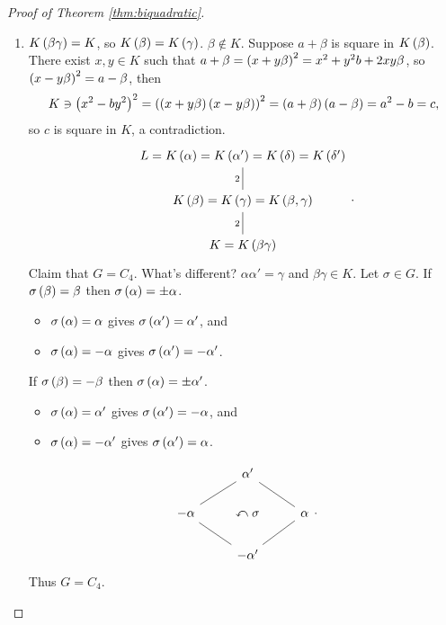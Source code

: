 \begin{proof}[Proof of Theorem \ref{thm:biquadratic}]
\begin{enumerate}
\item $ K\left( \beta\gamma \right) = K $, so $ K\left( \beta \right) = K\left( \gamma \right) $. $ \beta \notin K $. Suppose $ a + \beta $ is square in $ K\left( \beta \right) $. There exist $ x, y \in K $ such that $ a + \beta = \left( x + y\beta \right)^2 = x^2 + y^2b + 2xy\beta $, so $ \left( x - y\beta \right)^2 = a - \beta $, then
$$ K \ni \left( x^2 - by^2 \right)^2 = \left( \left( x + y\beta \right)\left( x - y\beta \right) \right)^2 = \left( a + \beta \right)\left( a - \beta \right) = a^2 - b = c, $$
so $ c $ is square in $ K $, a contradiction.
$$
\begin{tikzcd}
L = K\rb{\alpha} = K\rb{\alpha'} = K\rb{\delta} = K\rb{\delta'} \\
K\rb{\beta} = K\rb{\gamma} = K\rb{\beta, \gamma} \arrow[dash]{u}{2} \\
K = K\rb{\beta\gamma} \arrow[dash]{u}{2}
\end{tikzcd}.
$$
Claim that $ G = C_4 $. What's different? $ \alpha\alpha' = \gamma $ and $ \beta\gamma \in K $. Let $ \sigma \in G $. If $ \sigma\left( \beta \right) = \beta $ then $ \sigma\left( \alpha \right) = \pm\alpha $.
\begin{itemize}
\item $ \sigma\left( \alpha \right) = \alpha $ gives $ \sigma\left( \alpha' \right) = \alpha' $, and
\item $ \sigma\left( \alpha \right) = -\alpha $ gives $ \sigma\left( \alpha' \right) = -\alpha' $.
\end{itemize}
If $ \sigma\left( \beta \right) = -\beta $ then $ \sigma\left( \alpha \right) = \pm\alpha' $.
\begin{itemize}
\item $ \sigma\left( \alpha \right) = \alpha' $ gives $ \sigma\left( \alpha' \right) = -\alpha $, and
\item $ \sigma\left( \alpha \right) = -\alpha' $ gives $ \sigma\left( \alpha' \right) = \alpha $.
\end{itemize}
$$
\begin{tikzcd}
& \alpha' & \\
-\alpha \arrow[dash]{ur} & \curvearrowleft \sigma & \alpha \arrow[dash]{ul} \\
& -\alpha' \arrow[dash]{ul} \arrow[dash]{ur} &
\end{tikzcd}.
$$
Thus $ G = C_4 $.

\pagebreak


\end{enumerate}
\end{proof}
